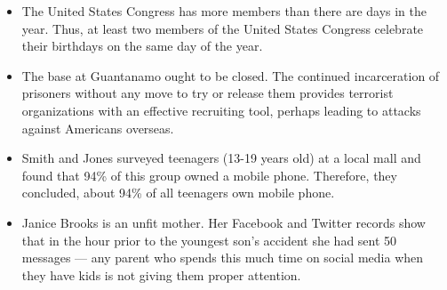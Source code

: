 \begin{itemize}

\item The United States Congress has more members than there are days in the year. Thus, at least two members of the United States Congress celebrate their birthdays on the same day of the year.


\item The base at Guantanamo ought to be closed. The continued incarceration of prisoners without any move to try or release them provides terrorist organizations with an effective recruiting tool, perhaps leading to attacks against Americans overseas.


\item Smith and Jones surveyed teenagers (13-19 years old) at a local mall and found that 94\% of this group owned a mobile phone. Therefore, they concluded, about 94\% of all teenagers own mobile phone.


\item Janice Brooks is an unfit mother. Her Facebook and Twitter records show that in the hour prior to the youngest son's accident she had sent 50 messages --- any parent who spends this much time on social media when they have kids is not giving them proper attention.


\end{itemize}
